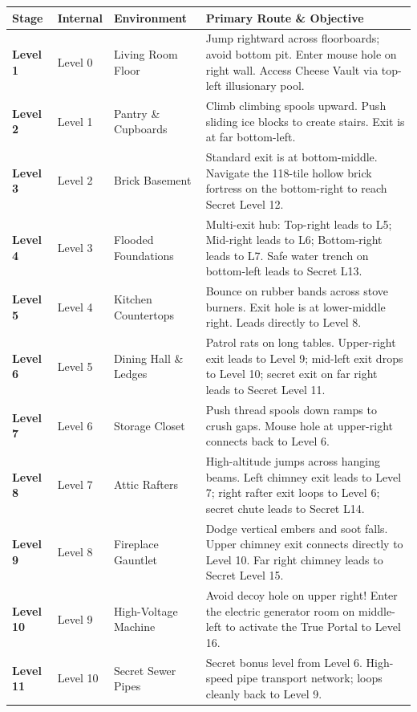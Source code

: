 \documentclass[10pt,letterpaper]{article}
\begin{document}
\begin{table}[h!]
\centering
\small
\renewcommand{\arraystretch}{1.10}
\begin{tabularx}{\linewidth}{lllX}
\toprule
\textbf{Stage} & \textbf{Internal} & \textbf{Environment} & \textbf{Primary Route \& Objective} \\
\midrule
\textbf{Level 1} & Level 0 & Living Room Floor & Jump rightward across floorboards; avoid bottom pit. Enter mouse hole on right wall. Access Cheese Vault via top-left illusionary pool. \\
\textbf{Level 2} & Level 1 & Pantry \& Cupboards & Climb climbing spools upward. Push sliding ice blocks to create stairs. Exit is at far bottom-left. \\
\textbf{Level 3} & Level 2 & Brick Basement & Standard exit is at bottom-middle. Navigate the 118-tile hollow brick fortress on the bottom-right to reach Secret Level 12. \\
\textbf{Level 4} & Level 3 & Flooded Foundations & Multi-exit hub: Top-right leads to L5; Mid-right leads to L6; Bottom-right leads to L7. Safe water trench on bottom-left leads to Secret L13. \\
\textbf{Level 5} & Level 4 & Kitchen Countertops & Bounce on rubber bands across stove burners. Exit hole is at lower-middle right. Leads directly to Level 8. \\
\textbf{Level 6} & Level 5 & Dining Hall \& Ledges & Patrol rats on long tables. Upper-right exit leads to Level 9; mid-left exit drops to Level 10; secret exit on far right leads to Secret Level 11. \\
\textbf{Level 7} & Level 6 & Storage Closet & Push thread spools down ramps to crush gaps. Mouse hole at upper-right connects back to Level 6. \\
\textbf{Level 8} & Level 7 & Attic Rafters & High-altitude jumps across hanging beams. Left chimney exit leads to Level 7; right rafter exit loops to Level 6; secret chute leads to Secret L14. \\
\textbf{Level 9} & Level 8 & Fireplace Gauntlet & Dodge vertical embers and soot falls. Upper chimney exit connects directly to Level 10. Far right chimney leads to Secret Level 15. \\
\textbf{Level 10} & Level 9 & High-Voltage Machine & Avoid decoy hole on upper right! Enter the electric generator room on middle-left to activate the True Portal to Level 16. \\
\midrule
\textbf{Level 11} & Level 10 & Secret Sewer Pipes & Secret bonus level from Level 6. High-speed pipe transport network; loops cleanly back to Level 9. \\

\end{tabularx}
\end{table}
\end{document}
